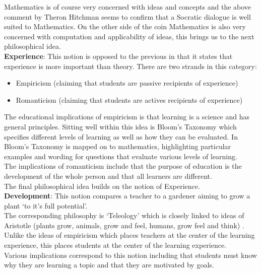 \documentclass[a4paper,12pt]{article}
\begin{document}
Mathematics is of course very concerned with ideas and concepts and the above comment by Theron Hitchman seems to confirm that a Socratic dialogue is well suited to Mathematics. On the other side of the coin Mathematics is also very concerned with computation and applicability of ideas, this brings us to the next philosophical idea.\\

\textbf{Experience}: This notion is opposed to the previous in that it states that experience is more important than theory. There are two strands in this category:

\begin{itemize}
    \item Empiricism (claiming that students are passive recipients of experience)
    \item Romanticism (claiming that students are actives recipients of experience)
\end{itemize}

The educational implications of empiricism is that learning is a science and has general principles. Sitting well within this idea is Bloom's Taxonomy \cite{Bloom1969a} which specifies different levels of learning as well as how they can be evaluated. In \cite{Shorser1999} Bloom's Taxonomy is mapped on to mathematics, highlighting particular examples and wording for questions that evaluate various levels of learning.\\

The implications of romanticism include that the purpose of education is the development of the whole person and that all learners are different.\\

The final philosophical idea builds on the notion of Experience.\\

\textbf{Development}: This notion compares a teacher to a gardener aiming to grow a plant `to it's full potential'.\\

The corresponding philosophy is `Teleology' which is closely linked to ideas of Aristotle (plants grow, animals, grow and feel, humans, grow feel and think) \cite{Aristotlea}. Unlike the ideas of empiricism which places teachers at the center of the learning experience, this places students at the center of the learning experience.\\

Various implications correspond to this notion including that students must know why they are learning a topic and that they are motivated by goals.\\
\end{document}
